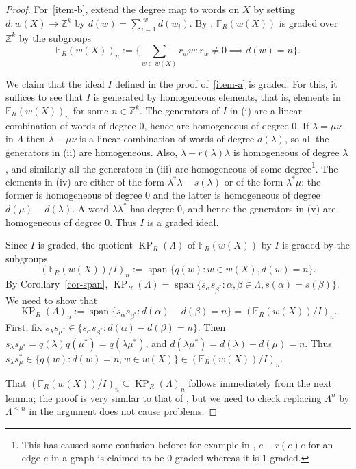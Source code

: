 \documentclass[a4paper,12pt]{amsart}
\numberwithin{equation}{section}
\theoremstyle{definition}
\theoremstyle{remark}
\begin{document}
\begin{proof}
For~\eqref{item-b},  extend the degree map to   words on $X$ by setting $d:w(X) \to {\mathbb{Z}}^k$
 by $d(w)=\sum_{i=1}^{|w|} d(w_i)$.
By \cite[Proposition~2.7]{ACaHR},   ${\mathbb{F}}_R(w(X))$ is graded over ${\mathbb{Z}}^k$ by
the subgroups
\[{\mathbb{F}}_R(w(X))_n:=\Big\{ \sum_{w \in w(X)} r_w w: r_w \neq 0 \implies d(w)=n \Big\}.\]

We claim that the ideal $I$ defined in the proof of~\eqref{item-a} is graded.  For this, it suffices to see that $I$ is generated by homogeneous elements, that is, elements in ${\mathbb{F}}_R(w(X))_n$ for some $n\in {\mathbb{Z}}^k$.  The generators of $I$ in (i) are a linear combination of words of degree $0$, hence are homogeneous of degree $0$. If $\lambda=\mu\nu$ in $\Lambda$ then  $\lambda-\mu\nu$ is a linear combination of words of degree $d(\lambda)$, so  all the generators in (ii) are homogeneous. Also, $\lambda-r(\lambda)\lambda$ is homogeneous of degree $\lambda$, and similarly  all the generators in (iii) are homogeneous of some degree\footnote{This has caused some confusion before: for example in \cite[Proof of Proposition~4.7]{T}, $e-r(e)e$ for an edge $e$ in a graph is claimed to be $0$-graded whereas it is $1$-graded.}.  The elements in  (iv) are either of the form  $\lambda^*\lambda-s(\lambda)$ or of the form $\lambda^*\mu$; the former is homogeneous of degree $0$ and the latter is homogeneous of degree $d(\mu)-d(
\lambda)$. A word $\lambda\lambda^*$ has degree $0$, and hence the generators in (v) are homogeneous of degree $0$.
Thus $I$ is a graded ideal. 

Since $I$ is graded,  the quotient $\operatorname{KP}_R(\Lambda)$ of
${\mathbb{F}}_R(w(X))$ by $I$ is graded by the subgroups 
\[
({\mathbb{F}}_R(w(X))/I)_n:={\operatorname{\mathrm{span}}} \{ q(w):w\in w(X),  d(w)=n \}.
\]
By Corollary~\ref{cor-span}, $\operatorname{KP}_R(\Lambda)={\operatorname{\mathrm{span}}}\{s_\alpha s_{\beta^*}:\alpha,\beta\in\Lambda, s(\alpha)=s(\beta)\}$. We need to show that 
\[
\operatorname{KP}_R(\Lambda)_n :=  {\operatorname{\mathrm{span}}}\{s_\alpha s_{\beta^{*}}: d(\alpha)-d(\beta)=n\}=({\mathbb{F}}_R(w(X))/I)_n.
\]
First, fix $s_\lambda s_{\mu^{*}} \in \{s_\alpha s_{\beta^{*}}:d(\alpha)-d(\beta)=n\}$. 
Then $s_\lambda s_{\mu^{*}}=q(\lambda)q(\mu^*)=q(\lambda\mu^{*})$,
 and  $d(\lambda\mu^{*})=d(\lambda)-d(\mu)=n$. Thus
$s_\lambda s_\mu^{*} \in \{q(w):d(w)=n, w \in w(X)\}\in ({\mathbb{F}}_R(w(X))/I)_n$. 

 That $ ({\mathbb{F}}_R(w(X))/I)_n \subseteq \operatorname{KP}_R(\Lambda)_n$ follows  immediately from the next lemma; the proof is very similar to that of \cite[Lemma~3.5]{ACaHR}, but we need to check replacing $\Lambda^n$  by $\Lambda^{\leq n}$ in the argument does not cause problems.  
\end{proof}
\end{document}
